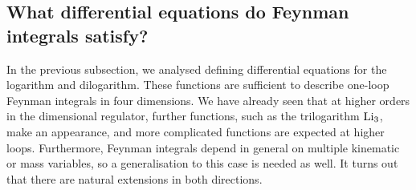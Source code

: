  
 

 
 
\subsection{What differential equations do Feynman integrals satisfy?}

In the previous subsection, we analysed defining differential equations for the logarithm and dilogarithm. 
These functions are sufficient to describe one-loop Feynman integrals in four dimensions.
We have already seen that at higher orders in the dimensional regulator, further functions, such as the trilogarithm ${\rm Li}_{3}$, make an appearance,
and more complicated functions are expected at higher loops.
Furthermore, Feynman integrals depend in general on multiple kinematic or mass variables, so a generalisation to this case is needed as well.
It turns out that there are natural extensions in both directions.

